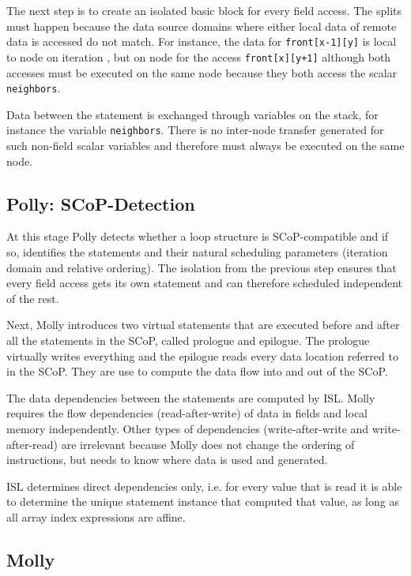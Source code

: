 \documentclass{sigplanconf}
\begin{document}
The next step is to create an isolated basic block for every field access. The splits must happen because the data source domains where either local data of remote data is accessed do not match. For instance, the data for \texttt{front[x-1][y]} is local to node  on iteration , but on node  for the access \texttt{front[x][y+1]} although both accesses must be executed on the same node because they both access the scalar \texttt{neighbors}. 

Data between the statement is exchanged through variables on the stack, for instance the variable \texttt{neighbors}. There is no inter-node transfer generated for such non-field scalar variables and therefore must always be executed on the same node.



\subsection{Polly: SCoP-Detection}

At this stage Polly detects whether a loop structure is SCoP-compatible and if so, identifies the statements and their natural scheduling parameters (iteration domain and relative ordering). The isolation from the previous step ensures that every field access gets its own statement and can therefore scheduled independent of the rest.

Next, Molly introduces two virtual statements that are executed before and after all the statements in the SCoP, called prologue and epilogue. The prologue virtually writes everything and the epilogue reads every data location referred to in the SCoP. They are use to compute the data flow into and out of the SCoP.

The data dependencies between the statements are computed by ISL. Molly requires the flow dependencies (read-after-write) of data in fields and local memory independently. Other types of dependencies (write-after-write and write-after-read) are irrelevant because Molly does not change the ordering of instructions, but needs to know where data is used and generated.

ISL determines direct dependencies only, i.e. for every value that is read it is able to determine the unique statement instance that computed that value, as long as all array index expressions are affine.


\subsection{Molly}
\end{document}
